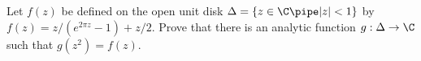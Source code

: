 Let $f(z)$ be defined on the open unit disk $\Delta=\{z\in \C\pipe
|z|<1\}$ by $f(z)=z/(e^{2\pi z}-1)+z/2$. Prove that there is an
analytic function $g:\Delta\rightarrow \C$ such that $g(z^2)=f(z)$.
